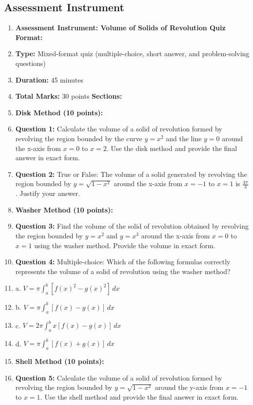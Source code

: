 \subsection{Assessment Instrument}

\begin{enumerate}
    \item \textbf{Assessment Instrument: Volume of Solids of Revolution Quiz} \textbf{Format:}
    \item \textbf{Type:} Mixed-format quiz (multiple-choice, short answer, and problem-solving questions)
    \item \textbf{Duration:} 45 minutes
    \item \textbf{Total Marks:} 30 points \textbf{Sections:}
    \item \textbf{Disk Method (10 points):}
    \item \textbf{Question 1:} Calculate the volume of a solid of revolution formed by revolving the region bounded by the curve $y = x^2$ and the line $y = 0$ around the x-axis from $x = 0$ to $x = 2$. Use the disk method and provide the final answer in exact form.
    \item \textbf{Question 2:} True or False: The volume of a solid generated by revolving the region bounded by $y = \sqrt{1 - x^2}$ around the x-axis from $x = -1$ to $x = 1$ is $\frac{4\pi}{3}$. Justify your answer.
    \item \textbf{Washer Method (10 points):}
    \item \textbf{Question 3:} Find the volume of the solid of revolution obtained by revolving the region bounded by $y = x^2$ and $y = x^3$ around the x-axis from $x = 0$ to $x = 1$ using the washer method. Provide the volume in exact form.
    \item \textbf{Question 4:} Multiple-choice: Which of the following formulas correctly represents the volume of a solid of revolution using the washer method?
    \item a. $V = \pi \int_a^b [f(x)^2 - g(x)^2] \, dx$
    \item b. $V = \pi \int_a^b [f(x) - g(x)] \, dx$
    \item c. $V = 2\pi \int_a^b x [f(x) - g(x)] \, dx$
    \item d. $V = \pi \int_a^b [f(x) + g(x)] \, dx$
    \item \textbf{Shell Method (10 points):}
    \item \textbf{Question 5:} Calculate the volume of a solid of revolution formed by revolving the region bounded by $y = \sqrt{1 - x^2}$ around the y-axis from $x = -1$ to $x = 1$. Use the shell method and provide the final answer in exact form.

\end{enumerate}
